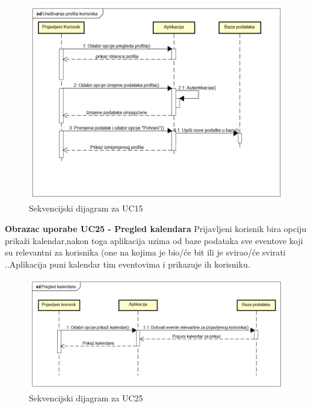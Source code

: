 				
				\begin{figure}[H]
					\begin{center}
						\includegraphics[width=15cm]{slike/uc15.PNG}
					\end{center}
					\caption{Sekvencijski dijagram za UC15}
					\label{fig:uc15}
				\end{figure}
				
				
				
			\eject
				 \textbf{Obrazac uporabe UC25 - Pregled kalendara}
			\newline
			{Prijavljeni korisnik bira opciju prikaži kalendar,nakon toga aplikacija uzima od baze podataka sve  eventove koji su relevantni za korisnika (one na kojima je bio/će bit ili je svirao/će svirati  .}.Aplikacija puni kalendar tim eventovima i prikazuje ih korisniku.\\
			
			\begin{figure}[H]
				\begin{center}
					\includegraphics[width=15cm]{slike/uc25.PNG}
				\end{center}
				\caption{Sekvencijski dijagram za UC25}
				\label{fig:uc25}
			\end{figure}
	
